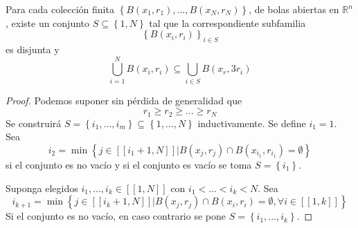 \documentclass[12pt]{report}
\newcounter{it}
\theoremstyle{largebreak}
\renewcommand{\geq}{\ensuremath{\geqslant}}
\newcommand{\natint}[1]{\ensuremath{\left[\!\left[#1\right]\!\right]}}
\begin{document}
    \begin{lema}
        Para cada colección finita $\left\{B(x_1,r_1),...,B(x_N,r_N) \right\}$, de bolas abiertas en $\mathbb{R}^n$, existe un conjunto $S\subseteq\left\{1,N\right\}$ tal que la correspondiente subfamilia
        \begin{equation*}
            \left\{B(x_i,r_i)\right\}_{ i\in S}
        \end{equation*}
        es disjunta y
        \begin{equation*}
            \bigcup_{ i=1}^N B(x_i,r_i)\subseteq\bigcup_{ i\in S}B(x_r,3r_i)
        \end{equation*}
    \end{lema}

    \begin{proof}
        Podemos suponer sin pérdida de generalidad que
        \begin{equation*}
            r_1\geq r_2\geq ...\geq r_N
        \end{equation*}
        Se construirá $S=\left\{i_1,...,i_m \right\}\subseteq\left\{1,...,N\right\}$ inductivamente. Se define $i_1=1$. Sea
        \begin{equation*}
            i_2=\min\left\{j\in\natint{i_1+1,N}\Big|B(x_j,r_j)\cap B(x_{ i_1}, r_{ i_1})=\emptyset \right\}
        \end{equation*}
        si el conjunto es no vacío y si el conjunto es vacío se toma $S=\left\{i_1 \right\}$.

        Suponga elegidos $i_1,...,i_k\in\natint{1,N}$ con $i_1<...<i_k<N$. Sea
        \begin{equation*}
            i_{ k+1}=\min\left\{j\in\natint{i_k+1,N}\Big|B(x_j,r_j)\cap B(x_i,r_i)=\emptyset,\forall i\in\natint{1,k} \right\}
        \end{equation*}
        Si el conjunto es no vacío, en caso contrario se pone $S=\left\{i_1,...,i_k\right\}$.


\end{proof}
\end{document}
